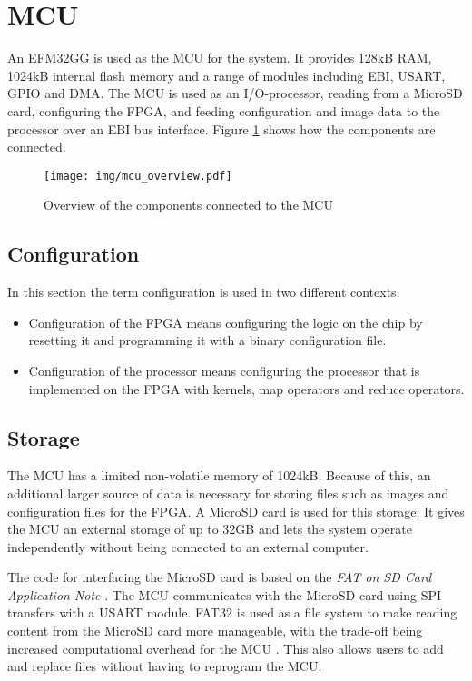 \section{MCU}

An EFM32GG is used as the MCU for the system.
It provides 128kB RAM, 1024kB internal flash memory and a range of modules including EBI, USART, GPIO and DMA.
The MCU is used as an I/O-processor, reading from a MicroSD card, configuring the FPGA, and feeding configuration and image data to the processor over an EBI bus interface.
Figure \ref{fig:mcuOverview} shows how the components are connected.

\begin{figure}[h!]
    \texttt{[image: img/mcu\_overview.pdf]}
    \caption{Overview of the components connected to the MCU}
    \label{fig:mcuOverview}
\end{figure}

\subsection{Configuration}
In this section the term configuration is used in two different contexts.
\begin{itemize}
	\item Configuration of the FPGA means configuring the logic on the chip by resetting it and programming it with a binary configuration file.
	\item Configuration of the processor means configuring the processor that is implemented on the FPGA with kernels, map operators and reduce operators.
\end{itemize}

\subsection{Storage}
The MCU has a limited non-volatile memory of 1024kB. Because of this, an additional larger source of data is necessary for storing files such as images and configuration files for the FPGA. A MicroSD card is used for this storage. It gives the MCU an external storage of up to 32GB and lets the system operate independently without being connected to an external computer.

The code for interfacing the MicroSD card is based on the \textit{FAT on SD Card Application Note} \cite{an0030}. The MCU communicates with the MicroSD card using SPI transfers with a USART module. FAT32 is used as a file system to make reading content from the MicroSD card more manageable, with the trade-off being increased computational overhead for the MCU \cite{msfat}. This also allows users to add and replace files without having to reprogram the MCU.

